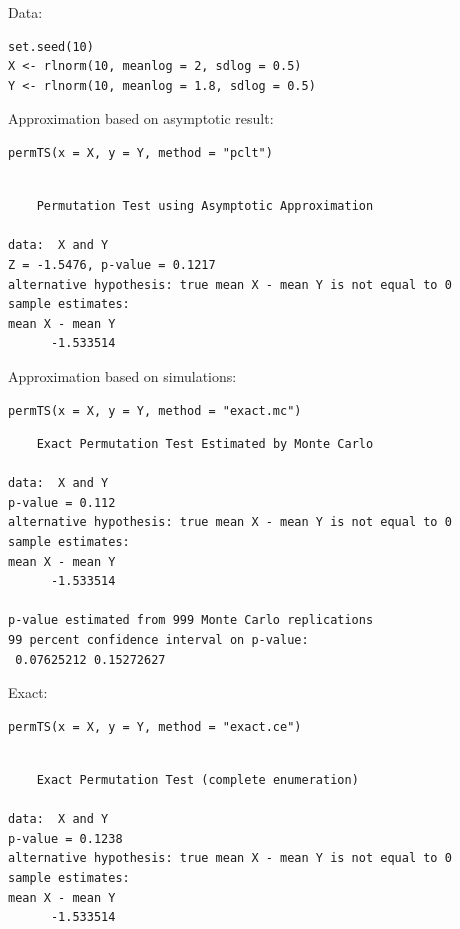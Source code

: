 \documentclass{article}
\begin{document}
Data:
\lstset{language=r,label= ,caption= ,captionpos=b,numbers=none}
\begin{lstlisting}
set.seed(10)
X <- rlnorm(10, meanlog = 2, sdlog = 0.5)
Y <- rlnorm(10, meanlog = 1.8, sdlog = 0.5)
\end{lstlisting}

Approximation based on asymptotic result:
\lstset{language=r,label= ,caption= ,captionpos=b,numbers=none}
\begin{lstlisting}
permTS(x = X, y = Y, method = "pclt")
\end{lstlisting}

\begin{verbatim}

	Permutation Test using Asymptotic Approximation

data:  X and Y
Z = -1.5476, p-value = 0.1217
alternative hypothesis: true mean X - mean Y is not equal to 0
sample estimates:
mean X - mean Y 
      -1.533514
\end{verbatim}

Approximation based on simulations:
\lstset{language=r,label= ,caption= ,captionpos=b,numbers=none}
\begin{lstlisting}
permTS(x = X, y = Y, method = "exact.mc")
\end{lstlisting}

\begin{verbatim}
	Exact Permutation Test Estimated by Monte Carlo

data:  X and Y
p-value = 0.112
alternative hypothesis: true mean X - mean Y is not equal to 0
sample estimates:
mean X - mean Y 
      -1.533514 

p-value estimated from 999 Monte Carlo replications
99 percent confidence interval on p-value:
 0.07625212 0.15272627
\end{verbatim}

Exact:
\lstset{language=r,label= ,caption= ,captionpos=b,numbers=none}
\begin{lstlisting}
permTS(x = X, y = Y, method = "exact.ce")
\end{lstlisting}

\begin{verbatim}

	Exact Permutation Test (complete enumeration)

data:  X and Y
p-value = 0.1238
alternative hypothesis: true mean X - mean Y is not equal to 0
sample estimates:
mean X - mean Y 
      -1.533514
\end{verbatim}
\end{document}
